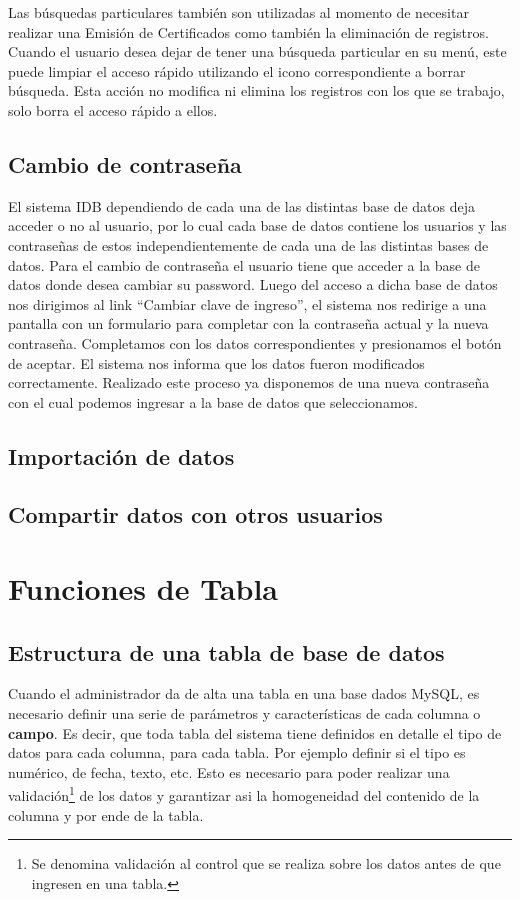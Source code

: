 \documentclass[a4paper,10pt]{article}
\begin{document}
Las búsquedas particulares también son utilizadas al momento de necesitar realizar una Emisión de Certificados como también la eliminación de registros. 
Cuando el usuario desea dejar de tener una búsqueda particular en su menú, este puede limpiar el  acceso rápido utilizando el icono correspondiente a borrar búsqueda. Esta acción no modifica ni elimina los registros con los que se trabajo, solo borra el acceso rápido a ellos.
    
\subsection{Cambio de contraseña}

El sistema IDB dependiendo de cada una de las distintas base de datos deja acceder o no al usuario, por lo cual cada base de datos contiene los usuarios y las contraseñas de estos independientemente de cada una de las distintas bases de datos.
Para el cambio de contraseña el usuario tiene que acceder a la base de datos donde desea cambiar su password. Luego del acceso a dicha base de datos nos dirigimos al link “Cambiar clave de ingreso”, el sistema nos redirige a una pantalla con un formulario para completar con la contraseña actual y la nueva contraseña. Completamos  con los datos correspondientes y presionamos el botón de aceptar. 
El sistema nos informa que los datos fueron modificados correctamente. Realizado este proceso ya disponemos de una nueva contraseña con el cual podemos ingresar a la base de datos que seleccionamos.

\subsection{Importación de datos}
\subsection{Compartir datos con otros usuarios}
\section{Funciones de Tabla}
\subsection{Estructura de una tabla de base de datos}

Cuando el administrador da de alta una tabla en una base dados MySQL, es necesario definir una serie de parámetros y características de cada columna o \textbf{campo}. Es decir, que toda tabla del sistema tiene  definidos en detalle el tipo de datos para cada columna, para cada tabla. Por ejemplo definir si el tipo es numérico, de fecha, texto, etc. Esto es necesario para poder realizar una validación\footnote{Se denomina validación al control que se realiza sobre los datos antes de que ingresen en una tabla.} de los datos y garantizar asi la homogeneidad del contenido de la columna y por ende de la tabla.
\end{document}
